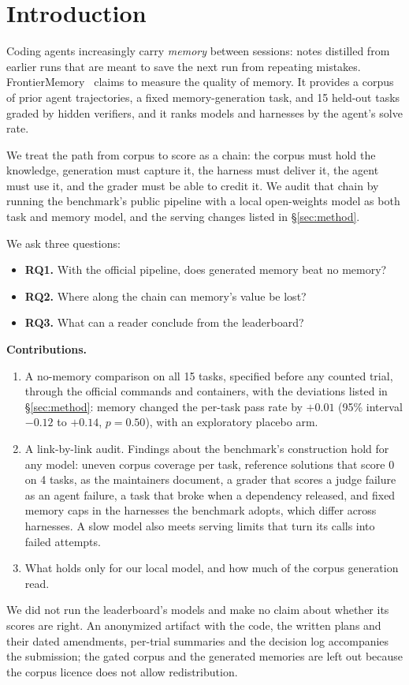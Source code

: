 \section{Introduction}
\label{sec:intro}
Coding agents increasingly carry \emph{memory} between sessions: notes distilled from earlier runs that are meant to save the next run from repeating mistakes.
FrontierMemory~\cite{frontiermemory} claims to measure the quality of memory.
It provides a corpus of prior agent trajectories, a fixed memory-generation task, and 15 held-out tasks graded by hidden verifiers, and it ranks models and harnesses by the agent's solve rate.

We treat the path from corpus to score as a chain: the corpus must hold the knowledge, generation must capture it, the harness must deliver it, the agent must use it, and the grader must be able to credit it.
We audit that chain by running the benchmark's public pipeline with a local open-weights model as both task and memory model, and the serving changes listed in \S\ref{sec:method}.

We ask three questions:
\begin{itemize}
  \item \textbf{RQ1.} With the official pipeline, does generated memory beat no memory?
  \item \textbf{RQ2.} Where along the chain can memory's value be lost?
  \item \textbf{RQ3.} What can a reader conclude from the leaderboard?
\end{itemize}

\textbf{Contributions.}
\begin{enumerate}
  \item A no-memory comparison on all 15 tasks, specified before any counted trial, through the official commands and containers, with the deviations listed in \S\ref{sec:method}: memory changed the per-task pass rate by $+0.01$ (95\% interval $-0.12$ to $+0.14$, $p=0.50$), with an exploratory placebo arm.
  \item A link-by-link audit. Findings about the benchmark's construction hold for any model: uneven corpus coverage per task, reference solutions that score 0 on 4 tasks, as the maintainers document, a grader that scores a judge failure as an agent failure, a task that broke when a dependency released, and fixed memory caps in the harnesses the benchmark adopts, which differ across harnesses. A slow model also meets serving limits that turn its calls into failed attempts.
  \item What holds only for our local model, and how much of the corpus generation read.
\end{enumerate}
We did not run the leaderboard's models and make no claim about whether its scores are right.
An anonymized artifact with the code, the written plans and their dated amendments, per-trial summaries and the decision log accompanies the submission; the gated corpus and the generated memories are left out because the corpus licence does not allow redistribution.
